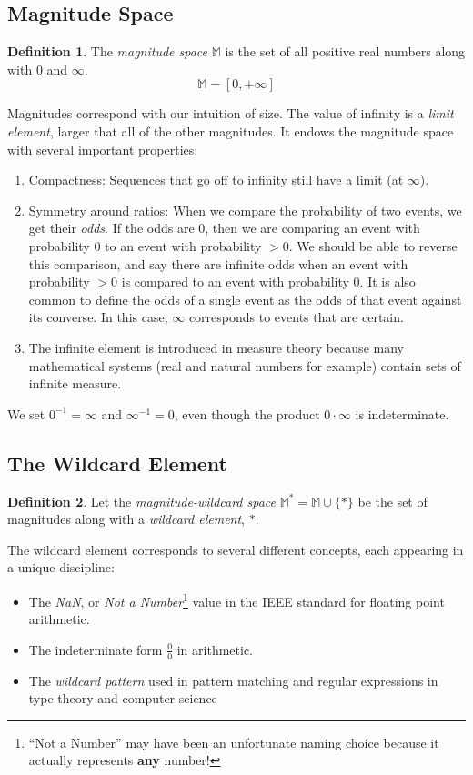 \documentclass[twoside]{article}
\theoremstyle{plain}%
\theoremstyle{definition}
\newtheorem{definition}{Definition}[section]
\theoremstyle{remark}
\begin{document}
\subsection{Magnitude Space}

\begin{definition}
The \textit{magnitude space} \(\mathbb{M}\) is the set of all positive real numbers along with \(0\) and \(\infty\).
\[\mathbb{M} = [0, +\infty]\]
\end{definition}

Magnitudes correspond with our intuition of size. The value of infinity is a \textit{limit element}, larger that all of the other magnitudes. It endows the magnitude space with several important properties:

\begin{enumerate}
\item Compactness: Sequences that go off to infinity still have a limit (at \(\infty\)).
\item Symmetry around ratios: When we compare the probability of two events, we get their \textit{odds}. If the odds are 0, then we are comparing an event with probability 0 to an event with probability \(>0\). We should be able to reverse this comparison, and say there are infinite odds when an event with probability \(>0\) is compared to an event with probability 0. It is also common to define the odds of a single event as the odds of that event against its converse. In this case, \(\infty\) corresponds to events that are certain.
\item The infinite element is introduced in measure theory because many mathematical systems (real and natural numbers for example) contain sets of infinite measure.
\end{enumerate}

We set \(0^{-1} = \infty\) and \(\infty^{-1} = 0\), even though the product \(0 \cdot \infty\) is indeterminate.

\subsection{The Wildcard Element}

\begin{definition}
Let the \textit{magnitude-wildcard space} \(\mathbb{M}^*= \mathbb{M} \cup \{\ast\}\) be the set of magnitudes along with a \textit{wildcard element}, \(\ast\).
\end{definition}

The wildcard element corresponds to several different concepts, each appearing in a unique discipline:
\begin{itemize}
  \item The \textit{NaN}, or \textit{Not a Number}\footnote{``Not a Number'' may have been an unfortunate naming choice because it actually represents \textbf{any} number!} value in the IEEE standard for floating point arithmetic\cite{ieee}.
  \item The indeterminate form \(\frac{0}{0}\) in arithmetic.
  \item The \textit{wildcard pattern} used in pattern matching and regular expressions in type theory and computer science
\end{itemize}
\end{document}
